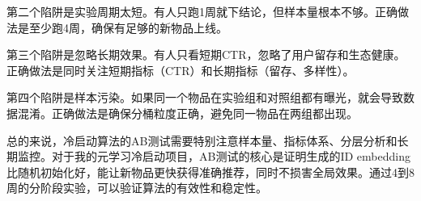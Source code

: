 \documentclass[UTF8]{ctexart}
\begin{document}
第二个陷阱是实验周期太短。有人只跑1周就下结论，但样本量根本不够。正确做法是至少跑4周，确保有足够的新物品上线。

第三个陷阱是忽略长期效果。有人只看短期CTR，忽略了用户留存和生态健康。正确做法是同时关注短期指标（CTR）和长期指标（留存、多样性）。

第四个陷阱是样本污染。如果同一个物品在实验组和对照组都有曝光，就会导致数据混淆。正确做法是确保分桶粒度正确，避免同一物品在两组都出现。

总的来说，冷启动算法的AB测试需要特别注意样本量、指标体系、分层分析和长期监控。对于我的元学习冷启动项目，AB测试的核心是证明生成的ID embedding比随机初始化好，能让新物品更快获得准确推荐，同时不损害全局效果。通过4到8周的分阶段实验，可以验证算法的有效性和稳定性。
\end{document}
